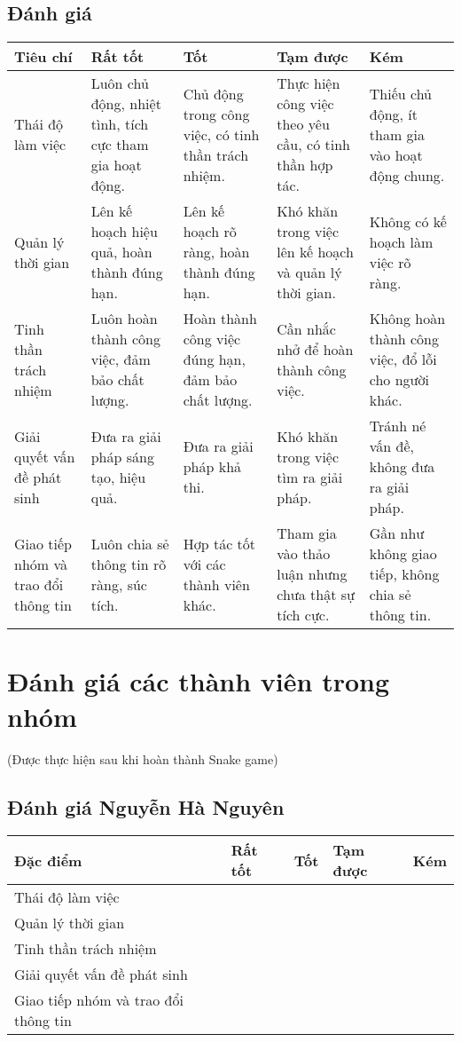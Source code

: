 \documentclass{article}
\begin{document}
\subsection{Đánh giá}
\begin{tabularx}{\textwidth}{|X|X|X|X|X|}
\hline
\textbf{Tiêu chí} & \textbf{Rất tốt} & \textbf{Tốt} & \textbf{Tạm được} & \textbf{Kém} \\
\hline
Thái độ làm việc & Luôn chủ động, nhiệt tình, tích cực tham gia hoạt động. & Chủ động trong công việc, có tinh thần trách nhiệm. & Thực hiện công việc theo yêu cầu, có tinh thần hợp tác. & Thiếu chủ động, ít tham gia vào hoạt động chung. \\
\hline
Quản lý thời gian & Lên kế hoạch hiệu quả, hoàn thành đúng hạn. & Lên kế hoạch rõ ràng, hoàn thành đúng hạn. & Khó khăn trong việc lên kế hoạch và quản lý thời gian. & Không có kế hoạch làm việc rõ ràng. \\
\hline
Tinh thần trách nhiệm & Luôn hoàn thành công việc, đảm bảo chất lượng. & Hoàn thành công việc đúng hạn, đảm bảo chất lượng. & Cần nhắc nhở để hoàn thành công việc. & Không hoàn thành công việc, đổ lỗi cho người khác. \\
\hline
Giải quyết vấn đề phát sinh & Đưa ra giải pháp sáng tạo, hiệu quả. & Đưa ra giải pháp khả thi. & Khó khăn trong việc tìm ra giải pháp. & Tránh né vấn đề, không đưa ra giải pháp. \\
\hline
Giao tiếp nhóm và trao đổi thông tin & Luôn chia sẻ thông tin rõ ràng, súc tích. & Hợp tác tốt với các thành viên khác. & Tham gia vào thảo luận nhưng chưa thật sự tích cực. & Gần như không giao tiếp, không chia sẻ thông tin. \\
\hline
\end{tabularx}

\section{Đánh giá các thành viên trong nhóm} (Được thực hiện sau khi hoàn thành Snake game)

\subsection{Đánh giá Nguyễn Hà Nguyên}
\begin{tabularx}{\textwidth}{|X|X|X|X|X|}
\hline
\textbf{Đặc điểm} & \textbf{Rất tốt} & \textbf{Tốt} & \textbf{Tạm được} & \textbf{Kém} \\
\hline
Thái độ làm việc &  & & & \\
\hline
Quản lý thời gian & &  & & \\
\hline
Tinh thần trách nhiệm &  & & & \\
\hline
Giải quyết vấn đề phát sinh & &  & & \\
\hline
Giao tiếp nhóm và trao đổi thông tin &  & & & \\
\hline
\end{tabularx}
\end{document}
